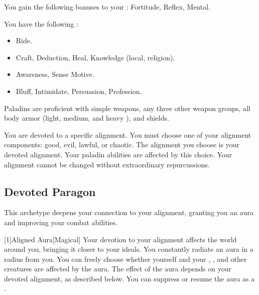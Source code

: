         You gain the following bonuses to your :  Fortitude,  Reflex,  Mental.

        You have the following :
        \begin{itemize}
            \item {} Ride.
            \item {} Craft, Deduction, Heal, Knowledge (local, religion).
            \item {} Awareness, Sense Motive.
            \item {} Bluff, Intimidate, Persuasion, Profession.
        \end{itemize}

        Paladins are proficient with simple weapons, any three other weapon groups, all body armor (light, medium, and heavy ), and shields.

        You are devoted to a specific alignment.
        You must choose one of your alignment components: good, evil, lawful, or chaotic.
        The alignment you choose is your devoted alignment.
        Your paladin abilities are affected by this choice.
        Your alignment cannot be changed without extraordinary repurcussions.

    \subsection{Devoted Paragon}
        This archetype deepens your connection to your alignment, granting you an aura and improving your combat abilities.

        [1]{Aligned Aura}[Magical]
        Your devotion to your alignment affects the world around you, bringing it closer to your ideals.
        You constantly radiate an aura in a \areamed radius  from you.
        You can freely choose whether yourself and your , , and other creatures are affected by the aura.
        The effect of the aura depends on your devoted alignment, as described below.
        You can suppress or resume the aura as a .

